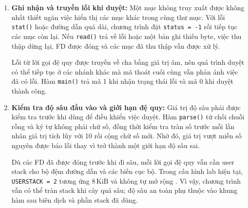 \begin{enumerate}
    \item \textbf{Ghi nhận và truyền lỗi khi duyệt:}
    Một mục không truy xuất được không nhất thiết ngăn việc hiển
    thị các mục khác trong cùng thư mục. Với lỗi \texttt{stat()}
    hoặc đường dẫn quá dài, chương trình đặt \texttt{status = -1}
    rồi tiếp tục các mục còn lại. Nếu \texttt{read()} trả về lỗi
    hoặc một bản ghi thiếu byte, việc thu thập dừng lại, FD được
    đóng và các mục đã thu thập vẫn được xử lý.

    Lỗi từ lời gọi đệ quy được truyền về cha bằng giá trị âm, nên
    quá trình duyệt có thể tiếp tục ở các nhánh khác mà mã thoát
    cuối cùng vẫn phản ánh việc đã có lỗi. Hàm \texttt{main()} trả
    mã 1 khi nhận trạng thái lỗi và mã 0 khi duyệt thành công.

    \item \textbf{Kiểm tra độ sâu đầu vào và giới hạn đệ quy:}
    Giá trị độ sâu phải được kiểm tra trước khi dùng để điều khiển
    việc duyệt. Hàm \texttt{parse()} từ chối chuỗi rỗng và ký tự
    không phải chữ số, đồng thời kiểm tra tràn số trước mỗi lần
    nhân giá trị tích lũy với 10 rồi cộng chữ số mới. Nhờ đó, giá trị
    vượt miền số nguyên được báo lỗi thay vì trở thành một giới
    hạn độ sâu sai.

    Dù các FD đã được đóng trước khi đi sâu, mỗi lời gọi đệ quy
    vẫn cần user stack cho bộ đệm đường dẫn và các biến cục bộ.
    Trong cấu hình lab hiện tại, \texttt{USERSTACK = 2} tương ứng
    $8\,\mathrm{KiB}$ và không tự mở rộng \cite{xv6param}. Vì vậy,
    chương trình vẫn có thể tràn stack khi cây quá sâu; độ sâu an
    toàn phụ thuộc vào khung hàm sau biên dịch và phần stack đã dùng.
\end{enumerate}

